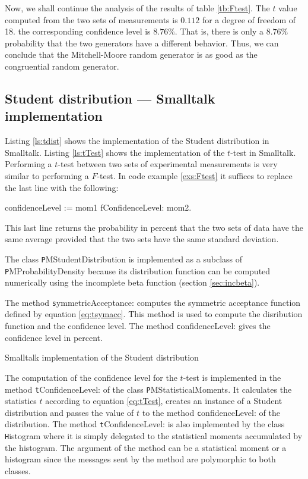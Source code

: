  Now, we shall continue the analysis of the
results of table \ref{tb:Ftest}. The $t$ value computed from the
two sets of measurements is $0.112$ for a degree of freedom of 18.
the corresponding confidence level is $8.76\%$. That is, there is
only a $8.76\%$ probability that the two generators have a
different behavior. Thus, we can conclude that the Mitchell-Moore
random generator is as good as the congruential random generator.

\subsection{Student distribution --- Smalltalk implementation}
 Listing \ref{ls:tdist} shows the
implementation of the Student distribution in Smalltalk. Listing
\ref{ls:tTest} shows the implementation of the $t$-test in
Smalltalk. Performing a $t$-test between two sets of experimental
measurements is very similar to performing a $F$-test. In code
example \ref{exs:Ftest} it suffices to replace the last line with
the following:
\begin{displaycode}
 confidenceLevel := mom1 fConfidenceLevel: mom2.
\end{displaycode}
This last line returns the probability in percent that the two
sets of data have the same average provided that the two sets have
the same standard deviation.

The class {\texttt PMStudentDistribution} is implemented as a
subclass of {\texttt PMProbabilityDensity} because its distribution
function can be computed numerically using the incomplete beta
function (\cf section \ref{sec:incbeta}).

The method {\texttt symmetricAcceptance:} computes the symmetric
acceptance function defined by equation \ref{eq:tsymacc}. This
method is used to compute the disribution function and the
confidence level. The method {\texttt confidenceLevel:} gives the
confidence level in percent.
\begin{listing} Smalltalk implementation of the Student distribution \label{ls:tdist}

\end{listing}

The computation of the confidence level for the $t$-test is
implemented in the method {\texttt tConfidenceLevel:} of the class
{\texttt PMStatisticalMoments}. It calculates the statistics $t$
according to equation \ref{eq:tTest}, creates an instance of a
Student distribution and passes the value of $t$ to the method
{\texttt confidenceLevel:} of the distribution. The method {\texttt
tConfidenceLevel:} is also implemented by the class {\texttt
Histogram} where it is simply delegated to the statistical moments
accumulated by the histogram. The argument of the method can be a
statistical moment or a histogram since the messages sent by the
method are polymorphic to both classes.

